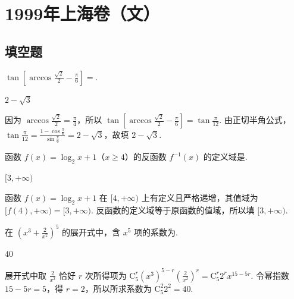 \chapter{1999年上海卷（文）}
\section{填空题}

\begin{problem}
\(\tan\left[\arccos\frac{\sqrt{2}}{2}-\frac{\pi}{6}\right]=\)\fillinblank{}.
\end{problem}

\begin{answer}
\(2-\sqrt{3}\)
\end{answer}

\begin{solution}
因为 \(\arccos\frac{\sqrt{2}}{2}=\frac{\pi}{4}\)，所以
\(\tan\left[\arccos\frac{\sqrt{2}}{2}-\frac{\pi}{6}\right]=\tan\frac{\pi}{12}\). 由正切半角公式，\(\tan\frac{\pi}{12}=\frac{1-\cos\frac{\pi}{6}}{\sin\frac{\pi}{6}}=2-\sqrt{3}\)，故填 \(2-\sqrt{3}\).
\end{solution}

\begin{problem}
函数 \(f(x)=\log_{2}x+1\)（\(x\geqslant4\)）的反函数 \(f^{-1}(x) \) 的定义域是\fillinblank{}.
\end{problem}

\begin{answer}
\([3,+\infty)\)
\end{answer}

\begin{solution}
函数 \(f(x)=\log_{2}x+1\) 在 \([4,+\infty)\) 上有定义且严格递增，其值域为 \([f(4),+\infty)=[3,+\infty)\). 反函数的定义域等于原函数的值域，所以填 \([3,+\infty)\).
\end{solution}

\begin{problem}
在 \((x^{3}+\frac{2}{x^{2}})^{5} \) 的展开式中，含 \(x^{5} \) 项的系数为\fillinblank{}.
\end{problem}

\begin{answer}
\(40\)
\end{answer}

\begin{solution}
展开式中取 \(\frac{2}{x^{2}}\) 恰好 \(r\) 次所得项为
\(\mathrm C_{5}^{r}(x^{3})^{5-r}\left(\frac{2}{x^{2}}\right)^{r}=\mathrm C_{5}^{r}2^{r}x^{15-5r}\). 令幂指数 \(15-5r=5\)，得 \(r=2\)，所以所求系数为 \(\mathrm C_{5}^{2}2^{2}=40\).
\end{solution}

